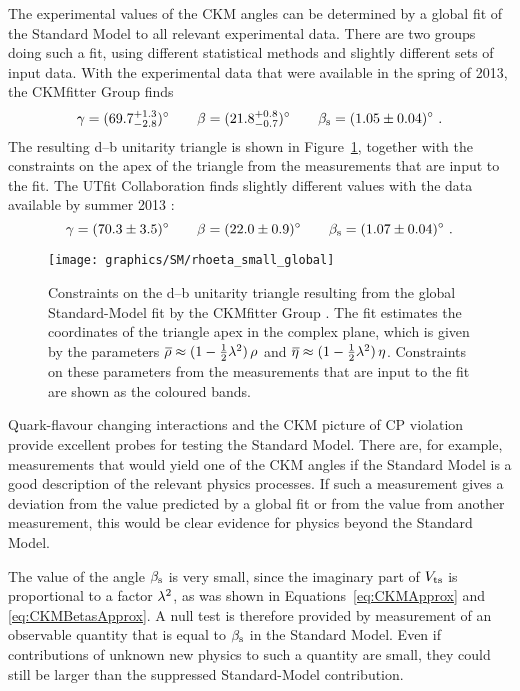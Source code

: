 The experimental values of the CKM angles can be determined by a global fit of the Standard Model to all relevant experimental data. There
are two groups doing such a fit, using different statistical methods and slightly different sets of input data.  With the experimental data
that were available in the spring of 2013, the CKMfitter Group finds \cite{Charles:2004jd}
\begin{equation}
   \gamma = (69.7^{+1.3}_{-2.8})^\circ \qquad \beta = (21.8^{+0.8}_{-0.7})^\circ \qquad \beta_\text{s} = (1.05\pm0.04)^\circ
  \ .
\end{equation}
The resulting d--b unitarity triangle is shown in Figure~\ref{fig:unitTriangleMeas}, together with the constraints on the apex of the
triangle from the measurements that are input to the fit. The UTfit Collaboration finds slightly different values with the data available
by summer 2013 \cite{Bona:2005vz}:
\begin{equation}
  \gamma = (70.3\pm3.5)^\circ \qquad \beta = (22.0\pm0.9)^\circ \qquad \beta_\text{s} = (1.07\pm0.04)^\circ
  \ .
\end{equation}

\begin{figure}[tb]
  \centering
  \texttt{[image: graphics/SM/rhoeta\_small\_global]}
  \caption{Constraints on the d--b unitarity triangle resulting from the global Standard-Model fit by the CKMfitter Group
           \cite{Charles:2004jd}. The fit estimates the coordinates of the triangle apex in the complex plane, which is given by the
	   parameters $\rhobar\approx(1-\tfrac{1}{2}\lam^2)\,\rho$ and $\etabar\approx(1-\tfrac{1}{2}\lam^2)\,\eta$.
           Constraints on these parameters from the measurements that are input to the fit are shown as the coloured bands.}
  \label{fig:unitTriangleMeas}
\end{figure}

Quark-flavour changing interactions and the CKM picture of CP violation provide excellent probes for testing the Standard Model. There are,
for example, measurements that would yield one of the CKM angles if the Standard Model is a good description of the relevant physics
processes. If such a measurement gives a deviation from the value predicted by a global fit or from the value from another measurement,
this would be clear evidence for physics beyond the Standard Model.

The value of the angle $\beta_\text{s}$ is very small, since the imaginary part of $V_\text{ts}$ is proportional to a factor $\lambda^2$, as was shown in
Equations~\ref{eq:CKMApprox} and \ref{eq:CKMBetasApprox}. A null test is therefore provided by measurement of an observable quantity that
is equal to $\beta_\text{s}$ in the Standard Model. Even if contributions of unknown new physics to such a quantity are small, they could still be
larger than the suppressed Standard-Model contribution. 

